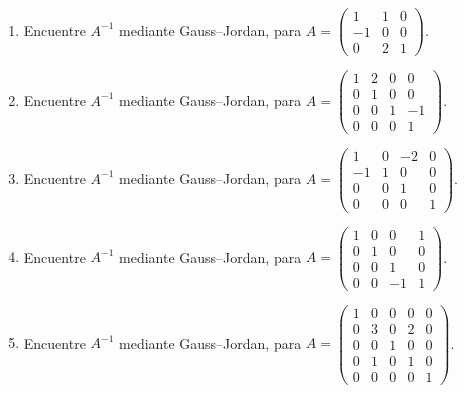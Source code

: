 \documentclass[12pt]{article}
\theoremstyle{remark}
\newcounter{contadorEjercicio}
\newenvironment{listaejercicios}{\begin{enumerate}[label=\textbf{E\arabic*.},leftmargin=2.4em,itemsep=0.52em]\setcounter{enumi}{\value{contadorEjercicio}}}{\setcounter{contadorEjercicio}{\value{enumi}}\end{enumerate}}
\begin{document}
\begin{listaejercicios}
\item Encuentre $A^{-1}$ mediante Gauss--Jordan, para $A=\begin{pmatrix}1&1&0\\-1&0&0\\0&2&1\end{pmatrix}$.

\item Encuentre $A^{-1}$ mediante Gauss--Jordan, para $A=\begin{pmatrix}1&2&0&0\\0&1&0&0\\0&0&1&-1\\0&0&0&1\end{pmatrix}$.

\item Encuentre $A^{-1}$ mediante Gauss--Jordan, para $A=\begin{pmatrix}1&0&-2&0\\-1&1&0&0\\0&0&1&0\\0&0&0&1\end{pmatrix}$.

\item Encuentre $A^{-1}$ mediante Gauss--Jordan, para $A=\begin{pmatrix}1&0&0&1\\0&1&0&0\\0&0&1&0\\0&0&-1&1\end{pmatrix}$.

\item Encuentre $A^{-1}$ mediante Gauss--Jordan, para $A=\begin{pmatrix}1&0&0&0&0\\0&3&0&2&0\\0&0&1&0&0\\0&1&0&1&0\\0&0&0&0&1\end{pmatrix}$.

\end{listaejercicios}
\end{document}
